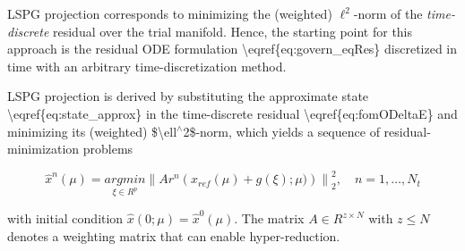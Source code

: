 L\+S\+PG projection corresponds to minimizing the (weighted) $\ell^2$-\/norm of the {\itshape time-\/discrete} residual over the trial manifold. Hence, the starting point for this approach is the residual O\+DE formulation \textbackslash{}eqref\{eq\+:govern\+\_\+eq\+Res\} discretized in time with an arbitrary time-\/discretization method.

L\+S\+PG projection is derived by substituting the approximate state \textbackslash{}eqref\{eq\+:state\+\_\+approx\} in the time-\/discrete residual \textbackslash{}eqref\{eq\+:fom\+O\+DeltaE\} and minimizing its (weighted) \$\textbackslash{}ell$^\wedge$2\$-\/norm, which yields a sequence of residual-\/minimization problems 

\[ \hat{x}^n(\mu) = \underset{\xi \in R^{p}}{arg min} \left\| A r^{n}\left(x_{ref}(\mu)+g(\xi);\mu)\right) \right\|_2^2,\quad n=1,\ldots,N_t \]

with initial condition $\hat{x}(0;\mu)=\hat{x}^0(\mu)$. The matrix $A \in R^{z \times N}$ with $z \leq N$ denotes a weighting matrix that can enable hyper-\/reduction. 